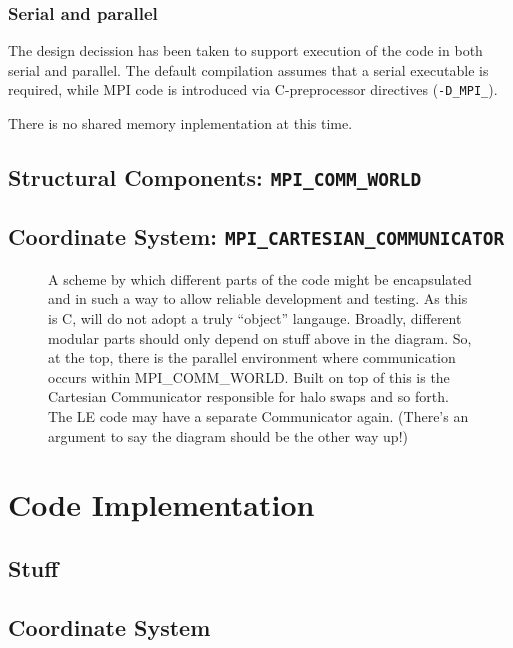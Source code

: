 \subsubsection{Serial and parallel}

The design decission has been taken to support execution of the
code in both serial and parallel. The default compilation
assumes that a serial executable is required, while  MPI code
is introduced via C-preprocessor directives (\texttt{-D\_MPI\_}).


There is no shared memory inplementation at this time.


\subsection{Structural Components: \texttt{MPI\_COMM\_WORLD}}


\subsection{Coordinate System: \texttt{MPI\_CARTESIAN\_COMMUNICATOR}}


\begin{figure}
\begin{center}
\end{center}
\caption{A scheme by which different parts of the code might be
encapsulated and in such a way to allow reliable development and
testing. As this is C, will do not adopt a truly ``object'' langauge.
Broadly, different modular parts should only depend on stuff above
in the diagram. So, at the top, there is the parallel environment
where communication occurs within MPI\_COMM\_WORLD. Built on top
of this is the Cartesian Communicator responsible for halo swaps
and so forth. The LE code may have a separate Communicator again. 
(There's an argument to say the diagram should be the other way up!)}
\end{figure}

\clearpage
\vfill\pagebreak

\section{Code Implementation}

\subsection{Stuff}

\subsection{Coordinate System}

